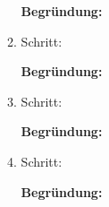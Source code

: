 \begin{enumerate}[label=\arabic*.]
\begin{enumerate}[label=\arabic*.)]
        \textbf{Begründung:} \underline{\hspace{8cm}}
        \vspace{0.5cm}

        \item Schritt: \underline{\hspace{8cm}}
        \vspace{0.5cm}

        \textbf{Begründung:} \underline{\hspace{8cm}}
        \vspace{0.5cm}

        \item Schritt: \underline{\hspace{8cm}}
        \vspace{0.5cm}

        \textbf{Begründung:} \underline{\hspace{8cm}}
        \vspace{0.5cm}

        \item Schritt: \underline{\hspace{8cm}}
        \vspace{0.5cm}

        \textbf{Begründung:} \underline{\hspace{8cm}}
        \vspace{0.5cm}
    \end{enumerate}

\end{enumerate}